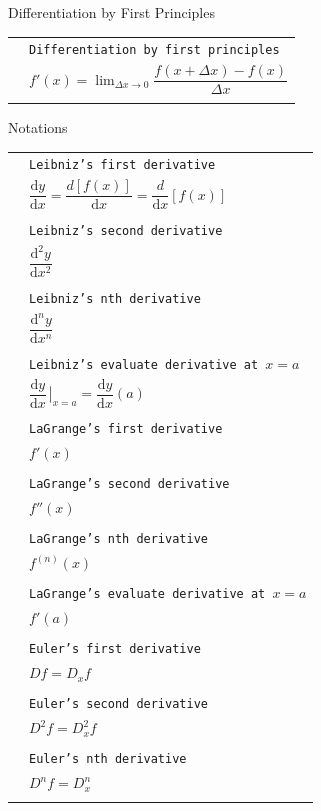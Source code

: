\documentclass[10pt,landscape]{article}
\newcommand{\cRed}[1]{{\color{sthlmRed}{#1}}}
\newcommand{\dd}{\mathrm{d}}
\newcommand{\dx}{\mathrm{d}x}
\newcommand{\dy}{\mathrm{d}y}
\newcommand{\dydx}{\dfrac{\mathrm{d}y}{\mathrm{d}x}}
\begin{document}
\begin{multicols}{3}
\begin{mysection}{Differentiation by First Principles}
\begin{tabular}{@{}ll@{}}
\cRed{DFP}			& \texttt{Differentiation by first principles} \\
						& \qquad $f'(x) = \displaystyle \lim_{\Delta x \to 0} \dfrac{f(x+\Delta x) - f(x)}{\Delta x}$\\
						&
\end{tabular}
\end{mysection}

\begin{mysection}{Notations}

\begin{tabular}{@{}ll@{}}
						& \texttt{Leibniz's first derivative} \\
						& \qquad $\dfrac{\dy}{\dx} = \dfrac{d \left[f(x) \right]}{\dx}= \dfrac{d}{\dx} \left[f(x) \right]$\\
						& \\
						& \texttt{Leibniz's second derivative} \\
						& \qquad $\dfrac{\dd^{2}y}{\dx^{2}}$\\
						& \\
						& \texttt{Leibniz's nth derivative} \\
						& \qquad $\dfrac{\dd^{n}y}{\dx^{n}}$\\
						& \\
						& \texttt{Leibniz's evaluate derivative at $x=a$} \\
						& \qquad $\dydx\left.{\!\!\frac{}{}}\right|_{x=a} = \dydx(a)$\\
						& \\
						& \texttt{LaGrange's first derivative} \\
						& \qquad $f'(x)$\\
						& \\
						& \texttt{LaGrange's second derivative} \\
						& \qquad $f''(x)$\\
						& \\
						& \texttt{LaGrange's nth derivative} \\
						& \qquad $f^{(n)}(x)$\\
						& \\
						& \texttt{LaGrange's evaluate derivative at $x=a$} \\
						& \qquad $f'(a)$\\
						& \\
						& \texttt{Euler's first derivative} \\
						& \qquad $Df =D_{x}f $\\
						& \\
						& \texttt{Euler's second derivative} \\
						& \qquad $D^{2}f=D_{x}^{2}f$\\
						& \\
						& \texttt{Euler's nth derivative} \\
						& \qquad $D^{n}f= D_{x}^{n}$\\
						& \\
\end{tabular}


\end{mysection}
\end{multicols}
\end{document}
